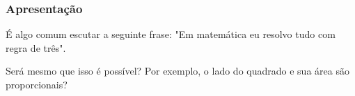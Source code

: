 \subsubsection{Apresentação}

É algo comum escutar a seguinte frase: "Em matemática eu
resolvo tudo com regra de três".

Será mesmo que isso é possível? Por exemplo, o lado do
quadrado e sua área são proporcionais?